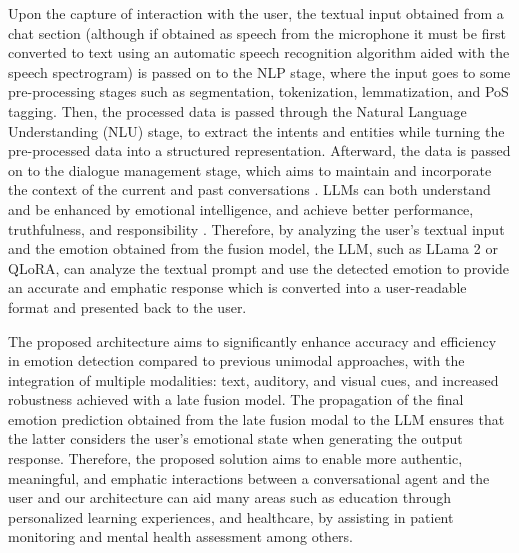 \documentclass[runningheads]{llncs}
\begin{document}
Upon the capture of interaction with the user, the textual input obtained from a chat section (although if obtained as speech from the microphone it must be first converted to text using an automatic speech recognition algorithm aided with the speech spectrogram) is passed on to the NLP stage, where the input goes to some pre-processing stages such as segmentation, tokenization, lemmatization, and PoS tagging. Then, the processed data is passed through the Natural Language Understanding (NLU) stage, to extract the intents and entities while turning the pre-processed data into a structured representation. Afterward, the data is passed on to the dialogue management stage, which aims to maintain and incorporate the context of the current and past conversations \cite{rizou_multilingual_2022}. LLMs can both understand and be enhanced by emotional intelligence, and achieve better performance, truthfulness, and responsibility \cite{li_large_2023}. Therefore, by analyzing the user's textual input and the emotion obtained from the fusion model, the LLM, such as LLama 2 or QLoRA, can analyze the textual prompt and use the detected emotion to provide an accurate and emphatic response which is converted into a user-readable format and presented back to the user.

The proposed architecture aims to significantly enhance accuracy and efficiency in emotion detection compared to previous unimodal approaches, with the integration of multiple modalities: text, auditory, and visual cues, and increased robustness achieved with a late fusion model. The propagation of the final emotion prediction obtained from the late fusion modal to the LLM ensures that the latter considers the user's emotional state when generating the output response.
Therefore, the proposed solution aims to enable more authentic, meaningful, and emphatic interactions between a conversational agent and the user and our architecture can aid many areas such as education through personalized learning experiences, and healthcare, by assisting in patient monitoring and mental health assessment among others.

\end{document}
